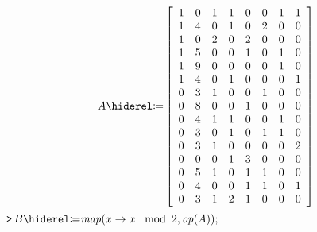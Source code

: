 \documentclass{article}
\begin{document}
\begin{dmath}\label{(6)}
A \coloneqq 
\\
\left[\begin{array}{cccccccc}
1 & 0 & 1 & 1 & 0 & 0 & 1 & 1 
\\
 1 & 4 & 0 & 1 & 0 & 2 & 0 & 0 
\\
 1 & 0 & 2 & 0 & 2 & 0 & 0 & 0 
\\
 1 & 5 & 0 & 0 & 1 & 0 & 1 & 0 
\\
 1 & 9 & 0 & 0 & 0 & 0 & 1 & 0 
\\
 1 & 4 & 0 & 1 & 0 & 0 & 0 & 1 
\\
 0 & 3 & 1 & 0 & 0 & 1 & 0 & 0 
\\
 0 & 8 & 0 & 0 & 1 & 0 & 0 & 0 
\\
 0 & 4 & 1 & 1 & 0 & 0 & 1 & 0 
\\
 0 & 3 & 0 & 1 & 0 & 1 & 1 & 0 
\\
 0 & 3 & 1 & 0 & 0 & 0 & 0 & 2 
\\
 0 & 0 & 0 & 1 & 3 & 0 & 0 & 0 
\\
 0 & 5 & 1 & 0 & 1 & 1 & 0 & 0 
\\
 0 & 4 & 0 & 0 & 1 & 1 & 0 & 1 
\\
 0 & 3 & 1 & 2 & 1 & 0 & 0 & 0 
\end{array}\right]
\end{dmath}
\mapleinput
{$ \displaystyle \texttt{>\,} B \coloneqq \mathit{map} (x \rightarrow x \,\mod \,2,\mathit{op} (A)); $}
\end{document}
